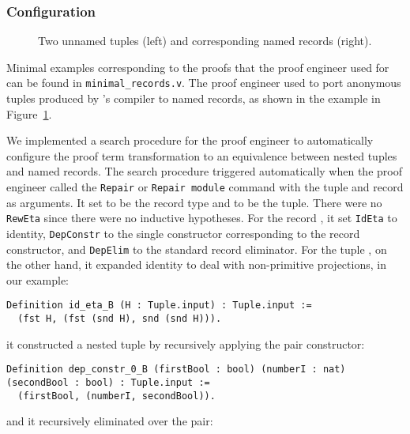 
\subsubsection{Configuration}

\begin{figure}
\begin{minipage}{0.25\textwidth}
   
\end{minipage}
\hfill
\begin{minipage}{0.74\textwidth}
   
\end{minipage}
\caption{Two unnamed tuples (left) and corresponding named records (right).}
\label{fig:records}
\end{figure}

Minimal examples corresponding to the proofs that the proof engineer used \toolname for
can be found in \lstinline{minimal_records.v}.
The proof engineer used \toolname to port anonymous tuples produced by \company's compiler
to named records, as shown in the example in Figure~\ref{fig:records}.

We implemented a search procedure for the proof engineer to automatically configure the proof term transformation to an equivalence
between nested tuples and named records.
The search procedure triggered automatically when the proof engineer called the \lstinline{Repair} or \lstinline{Repair module} command
with the tuple and record as arguments.
It set \A to be the record type and \B to be the tuple.
There were no \lstinline{RewEta} since there were no inductive hypotheses.
For the record \A, it set \lstinline{IdEta} to identity, \lstinline{DepConstr} to the single
constructor corresponding to the record constructor, and \lstinline{DepElim} to the standard record eliminator.
For the tuple \B, on the other hand, it expanded identity to deal with non-primitive projections,
in our example:
\begin{lstlisting}
Definition id_eta_B (H : Tuple.input) : Tuple.input :=
  (fst H, (fst (snd H), snd (snd H))).
\end{lstlisting}
it constructed a nested tuple by recursively applying the pair constructor:

\begin{lstlisting}
Definition dep_constr_0_B (firstBool : bool) (numberI : nat) (secondBool : bool) : Tuple.input :=
  (firstBool, (numberI, secondBool)).
\end{lstlisting}
and it recursively eliminated over the pair:

